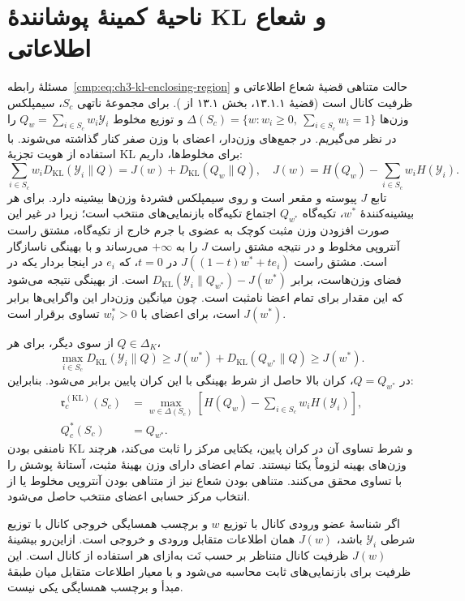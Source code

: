 \section{ناحیهٔ کمینهٔ پوشانندهٔ KL و شعاع اطلاعاتی}
\label{app:geometry-kl-information-radius}
مسئلهٔ رابطه~\eqref{cmp:eq:ch3-kl-enclosing-region}
حالت متناهی قضیهٔ شعاع اطلاعاتی و ظرفیت کانال است
(قضیهٔ ۱۳.۱.۱، بخش ۱۳.۱ از \cite{CoverThomas2006}).
برای مجموعهٔ ناتهی $S_c$، سیمپلکس وزن‌ها
$\Delta(S_c)=\{w:w_i\ge0,\ \sum_{i\in S_c}w_i=1\}$
و توزیع مخلوط $Q_w=\sum_{i\in S_c}w_i\mathscr Y_i$
را در نظر می‌گیریم. در جمع‌های وزن‌دار، اعضای با وزن
صفر کنار گذاشته می‌شوند. با استفاده از هویت تجزیهٔ KL
برای مخلوط‌ها، داریم:
\[
\sum_{i\in S_c}w_iD_{\mathrm{KL}}(\mathscr Y_i\|Q)
=J(w)+D_{\mathrm{KL}}(Q_w\|Q),
\quad
J(w)=H(Q_w)-\sum_{i\in S_c}w_iH(\mathscr Y_i).
\]
تابع $J$ پیوسته و مقعر است و روی سیمپلکس فشردهٔ
وزن‌ها بیشینه دارد. برای هر بیشینه‌کنندهٔ $w^*$،
تکیه‌گاه $Q_{w^*}$ اجتماع تکیه‌گاه بازنمایی‌های
منتخب است؛ زیرا در غیر این صورت افزودن وزن مثبت
کوچک به عضوی با جرم خارج از تکیه‌گاه، مشتق راست
آنتروپی مخلوط و در نتیجه مشتق راست $J$ را به
$+\infty$ می‌رساند و با بهینگی ناسازگار است.
مشتق راست $J((1-t)w^*+t e_i)$ در $t=0$، که
$e_i$ در اینجا بردار یکه در فضای وزن‌هاست، برابر
$D_{\mathrm{KL}}(\mathscr Y_i\|Q_{w^*})-J(w^*)$
است. از بهینگی نتیجه می‌شود که این مقدار برای
تمام اعضا نامثبت است. چون میانگین وزن‌دار این
واگرایی‌ها برابر $J(w^*)$ است، برای اعضای با
$w_i^*>0$ تساوی برقرار است.

از سوی دیگر، برای هر $Q\in\Delta_K$،
\[
\max_{i\in S_c}D_{\mathrm{KL}}(\mathscr Y_i\|Q)
\ge J(w^*)+D_{\mathrm{KL}}(Q_{w^*}\|Q)
\ge J(w^*).
\]
در $Q=Q_{w^*}$، کران بالا حاصل از شرط بهینگی
با این کران پایین برابر می‌شود. بنابراین:
\begin{equation}\label{cmp:eq:ch3-kl-information-radius-dual}
\boxed{\begin{aligned}
\mathfrak r_c^{(\mathrm{KL})}(S_c)
&=\max_{w\in\Delta(S_c)}
\left[H(Q_w)-\sum_{i\in S_c}w_iH(\mathscr Y_i)\right],\\
Q_c^*(S_c)&=Q_{w^*}.
\end{aligned}}
\end{equation}
نامنفی بودن KL و شرط تساوی آن در کران پایین،
یکتایی مرکز را ثابت می‌کند، هرچند وزن‌های بهینه
لزوماً یکتا نیستند. تمام اعضای دارای وزن بهینهٔ
مثبت، آستانهٔ پوشش را با تساوی محقق می‌کنند.
متناهی بودن شعاع نیز از متناهی بودن آنتروپی
مخلوط یا از انتخاب مرکز حسابی اعضای منتخب حاصل
می‌شود.

اگر شناسهٔ عضو ورودی کانال با توزیع $w$ و
برچسب همسایگی خروجی کانال با توزیع شرطی
$\mathscr Y_i$ باشد، $J(w)$ همان اطلاعات متقابل
ورودی و خروجی است. ازاین‌رو بیشینهٔ $J(w)$
ظرفیت کانال متناظر بر حسب نَت به‌ازای هر استفاده
از کانال است. این ظرفیت برای بازنمایی‌های ثابت
محاسبه می‌شود و با معیار اطلاعات متقابل میان
طبقهٔ مبدأ و برچسب همسایگی یکی نیست.

